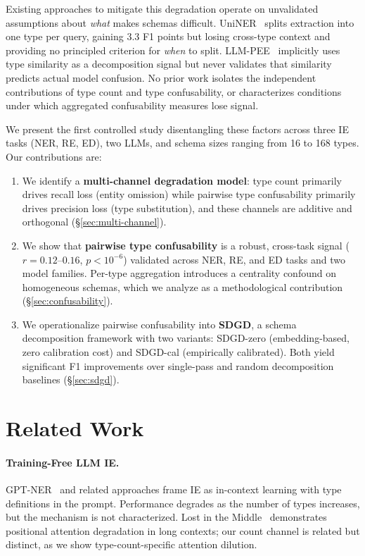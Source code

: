 \documentclass[11pt,a4paper]{article}
\begin{document}
Existing approaches to mitigate this degradation operate on unvalidated assumptions about \emph{what} makes schemas difficult.
UniNER~\cite{zhou2024universalner} splits extraction into one type per query, gaining 3.3 F1 points but losing cross-type context and providing no principled criterion for \emph{when} to split.
LLM-PEE~\cite{zhang2024llmpee} implicitly uses type similarity as a decomposition signal but never validates that similarity predicts actual model confusion.
No prior work isolates the independent contributions of type count and type confusability, or characterizes conditions under which aggregated confusability measures lose signal.

We present the first controlled study disentangling these factors across three IE tasks (NER, RE, ED), two LLMs, and schema sizes ranging from 16 to 168 types.
Our contributions are:

\begin{enumerate}
\item We identify a \textbf{multi-channel degradation model}: type count primarily drives recall loss (entity omission) while pairwise type confusability primarily drives precision loss (type substitution), and these channels are additive and orthogonal (\S\ref{sec:multi-channel}).

\item We show that \textbf{pairwise type confusability} is a robust, cross-task signal ($r = 0.12$--$0.16$, $p < 10^{-6}$) validated across NER, RE, and ED tasks and two model families. Per-type aggregation introduces a centrality confound on homogeneous schemas, which we analyze as a methodological contribution (\S\ref{sec:confusability}).

\item We operationalize pairwise confusability into \textbf{SDGD}, a schema decomposition framework with two variants: SDGD-zero (embedding-based, zero calibration cost) and SDGD-cal (empirically calibrated). Both yield significant F1 improvements over single-pass and random decomposition baselines (\S\ref{sec:sdgd}).
\end{enumerate}


\section{Related Work}
\label{sec:related}

\paragraph{Training-Free LLM IE.}
GPT-NER~\cite{wang2023gptner} and related approaches frame IE as in-context learning with type definitions in the prompt. Performance degrades as the number of types increases, but the mechanism is not characterized. Lost in the Middle~\cite{liu2024lost} demonstrates positional attention degradation in long contexts; our count channel is related but distinct, as we show type-count-specific attention dilution.
\end{document}
